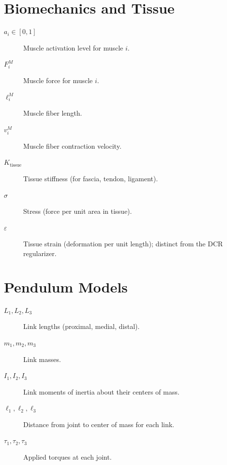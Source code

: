\section*{Biomechanics and Tissue}
\begin{description}
    \item[{$a_i \in [0, 1]$}] Muscle activation level for muscle $i$.
    \item[$F^M_i$] Muscle force for muscle $i$.
    \item[$\ell^M_i$] Muscle fiber length.
    \item[$v^M_i$] Muscle fiber contraction velocity.
    \item[$K_{\mathrm{tissue}}$] Tissue stiffness (for fascia, tendon, ligament).
    \item[$\sigma$] Stress (force per unit area in tissue).
    \item[$\varepsilon$] Tissue strain (deformation per unit length); distinct from the DCR regularizer.
\end{description}

\section*{Pendulum Models}
\begin{description}
    \item[$L_1, L_2, L_3$] Link lengths (proximal, medial, distal).
    \item[$m_1, m_2, m_3$] Link masses.
    \item[$I_1, I_2, I_3$] Link moments of inertia about their centers of mass.
    \item[$\ell_1, \ell_2, \ell_3$] Distance from joint to center of mass for each link.
    \item[$\tau_1, \tau_2, \tau_3$] Applied torques at each joint.
\end{description}
